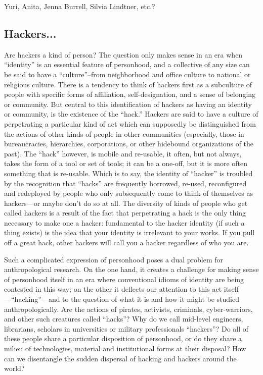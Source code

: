 \documentclass[10pt,letter,oneside]{scrartcl}
\begin{document}
Yuri, Anita, Jenna Burrell, Silvia Lindtner, etc.?

\subsection{Hackers...}

Are hackers a kind of person?  The question only makes sense in an era when ``identity'' is an essential feature of personhood, and a collective of any size can be said to have a ``culture''--from neighborhood and office culture to national or religious culture.   There is a tendency to think of hackers first as a subculture of people with specific forms of affiliation, self-designation, and a sense of belonging or community.  But central to this identification of hackers as having an identity or community, is the existence of the ``hack.''  Hackers are said to have a culture of perpetrating a particular kind of act which can supposedly be distinguished from the actions of other kinds of people in other communities (especially, those in bureaucracies, hierarchies, corporations, or other hidebound organizations of the past).  The ``hack'' however, is mobile and re-usable, it often, but not always, takes the form of a tool or set of tools; it can be a one-off, but it is more often something that is re-usable.  Which is to say, the identity of ``hacker'' is troubled by the recognition that ``hacks'' are frequently borrowed, re-used, reconfigured and redeployed by people who only subsequently come to think of themselves as hackers---or maybe don’t do so at all. The diversity of kinds of people who get called hackers is a result of the fact that perpetrating a hack is the only thing necessary to make one a hacker: fundamental to the hacker identity (if such a thing exists) is the idea that your identity is irrelevant to your works.  If you pull off a great hack, other hackers will call you a hacker regardless of who you are. 

Such a complicated expression of personhood poses a dual problem for anthropological research.  On the one hand, it creates a challenge for making sense of personhood itself in an era where conventional idioms of identity are being contested in this way; on the other it deflects our attention to this act itself---``hacking''---and to the question of what it is and how it might be studied anthropologically.  Are the actions of  pirates, activists, criminals, cyber-warriors, and other such creatures called ``hacks''?  Why do we call mid-level engineers, librarians, scholars in universities or military professionals ``hackers''?   Do all of these people share a particular disposition of personhood, or do they share a milieu of technologies, material and institutional forms at their disposal?  How can we disentangle the sudden dispersal of hacking and hackers around the world?
\end{document}
